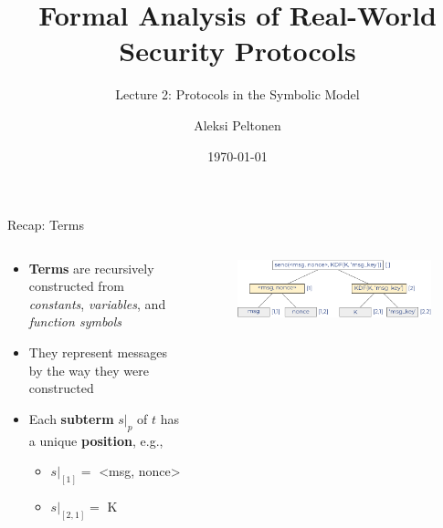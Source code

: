 \documentclass[11pt,aspectratio=169]{beamer}
\title{Formal Analysis of Real-World Security Protocols}
\subtitle{Lecture 2: Protocols in the Symbolic Model}
\date{\today}
\author{Aleksi Peltonen}
\institute{CISPA Helmholtz Center for Information Security}
\begin{document}
\maketitle


\begin{frame}[fragile]{Recap: Terms}
    \begin{columns}
        \begin{column}[c]{0.5\textwidth}
            \begin{itemize}
                \item \textbf{Terms} are recursively constructed from
                      \textit{constants}, \textit{variables}, and
                      \textit{function symbols}
                \item They represent messages by the way they were constructed
                \item Each \textbf{subterm} $s|_p$ of $t$ has a unique
                      \textbf{position}, e.g.,
                \begin{itemize}
                    \item $s|_{[1]} = $ <msg, nonce>
                    \item $s|_{[2,1]} = $ K
                \end{itemize}
            \end{itemize}
        \end{column}
        \begin{column}[c]{0.5\textwidth}
            \begin{figure}
                \includegraphics[width=1.05\textwidth]{figures/lecture_2/terms}
            \end{figure}
        \end{column}
    \end{columns}
    \vsep
\end{frame}
\end{document}
